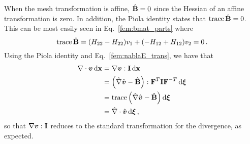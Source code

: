 \documentclass[../doc.tex]{subfiles}
\begin{document}
When the mesh transformation is affine, $\hmat{B} = 0$ since the Hessian of an affine transformation is zero. In addition, the Piola identity states that $\tr\hmat{B} = 0$. This can be most easily seen in Eq.~\ref{fem:bmat_parts} where 
	\begin{equation}
		\tr\hmat{B} = (H_{22} - H_{22}) v_1 + (-H_{12} + H_{12}) v_2 = 0 \,. 
	\end{equation}
Using the Piola identity and Eq.~\ref{fem:nablaE_trans}, we have that 
	\begin{equation}
	\begin{aligned}
		\nabla\cdot\vec{v} \ud \x &= \nabla\vec{v} : \I \ud \x \\
		&= \paren{\hnabla\hvec{v} - \hmat{B}} : \mat{F}^T\I\mat{F}^{-T} \ud \vec{\xi} \\
		&= \tr\paren{\hnabla\hvec{v} - \hmat{B}} \ud \vec{\xi} \\
		&= \hnabla\cdot\hvec{v} \ud \vec{\xi} \,, 
	\end{aligned}
	\end{equation}
so that $\nabla\vec{v} : \I$ reduces to the standard transformation for the divergence, as expected. 
\end{document}
